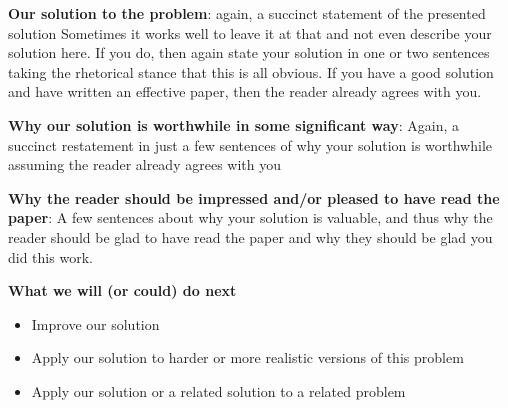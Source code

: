 \documentclass[pdf,bookmarks,colorlinks=true]{IEEEtran}
\begin{document}
\textbf{Our solution to the problem}: again, a succinct statement of the presented solution
Sometimes it works well to leave it at that and not even describe your
solution here. If you do, then again state your solution in one or two
sentences taking the rhetorical stance that this is all obvious. If you have a
good solution and have written an effective paper, then the reader already
agrees with you.

\textbf{Why our solution is worthwhile in some significant way}:
Again, a succinct restatement in just a few sentences of why your solution is
worthwhile assuming the reader already agrees with you

\textbf{Why the reader should be impressed and/or pleased to have read the paper}:
A few sentences about why your solution is valuable, and thus why the
reader should be glad to have read the paper and why they should be glad you
did this work.



\textbf{What we will (or could) do next}

\begin{itemize}
\item   Improve our solution
\item   Apply our solution to harder or more realistic versions of this problem
\item   Apply our solution or a related solution to a related problem

\end{itemize}




\end{document}
